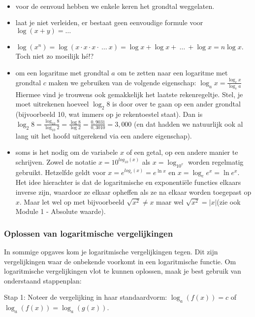 \begin{opmerking}
	\ \\
\begin{itemize}
\item voor de eenvoud hebben we enkele keren het grondtal weggelaten. 
\item laat je niet verleiden, er bestaat geen eenvoudige formule voor $\log\left(x+y\right)=\ldots$
\item $\log\left(x^{n}\right)=\log\left(x\cdot x\cdot x\cdot \:\ldots\:x\right)=\log x+\log x+\:\ldots\:+\log x=n\log x$.
Toch niet zo moeilijk h\'e!?
\item om een logaritme met grondtal $a$ om te zetten naar een logaritme met
grondtal $c$ maken we gebruiken van de volgende eigenschap: $\log_{a}x=\frac{\log_{c}x}{\log_{c}a}$
Hiermee vind je trouwens ook gemakkelijk het laatste rekenregeltje.
Stel, je moet uitrekenen hoeveel $\log_{2}8$ is door
over te gaan op een ander grondtal (bijvoorbeeld 10, wat immers op
je rekentoestel staat). Dan is $\log_{2}8=\frac{\log_{10}8}{\log_{10}2}=\frac{\log8}{\log2}=\frac{0,9031}{0,3010}=3,000$
(en dat hadden we natuurlijk ook al lang uit het hoofd uitgerekend
via een andere eigenschap).
\item soms is het nodig om de variabele $x$ of een getal, op een andere
manier te schrijven. Zowel de notatie $x=10^{log_{10}(x)}$
als $x=\log_{10^x}$ worden regelmatig gebruikt.
Hetzelfde geldt voor $x=e^{log_{e}(x)}=e^{\ln x}$
en $x=\log_{e}e^{x}=\ln e^{x}$. Het idee hierachter
is dat de logaritmische en exponenti\"ele functies elkaars inverse zijn,
waardoor ze elkaar opheffen als ze na elkaar worden toegepast op $x$.
Maar let wel op met bijvoorbeeld $\sqrt{x^{2}}\neq x$
maar wel $\sqrt{x^{2}}=\left|x\right|$(zie ook Module
1 - Absolute waarde).
\end{itemize}

\end{opmerking}

\subsubsection{Oplossen van logaritmische vergelijkingen}

In sommige opgaves kom je logaritmische vergelijkingen tegen. Dit
zijn vergelijkingen waar de onbekende voorkomt in een logaritmische
functie. Om logaritmische vergelijkingen vlot te kunnen oplossen,
maak je best gebruik van onderstaand stappenplan:

Stap 1: Noteer de vergelijking in haar standaardvorm: $ \log_{a}\left(f(x)\right)=c$
of $ \log_{a}\left(f(x)\right)=\log_{a}\left(g(x)\right)$.

